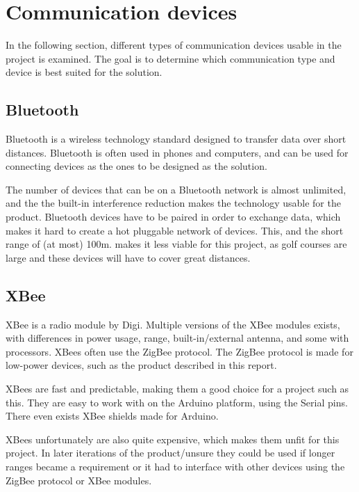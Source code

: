 \section{Communication devices}
In the following section, different types of communication devices usable in the project is examined. The goal is to determine which communication type and device is best suited for the solution.

\subsection{Bluetooth}
Bluetooth is a wireless technology standard designed to transfer data over short distances. Bluetooth is often used in phones and computers, and can be used for connecting devices as the ones to be designed as the solution. 

The number of devices that can be on a Bluetooth network is almost unlimited, and the the built-in interference reduction makes the technology usable for the product\cite{bluetoothbasics}.
Bluetooth devices have to be paired in order to exchange data, which makes it hard to create a hot pluggable network of devices. This, and the short range of (at most) 100m\cite{bluetoothbasics}. makes it less viable for this project, as golf courses are large and these devices will have to cover great distances.

\subsection{XBee}
XBee is a radio module by Digi. Multiple versions of the XBee modules exists, with differences in power usage, range, built-in/external antenna, and some with processors\cite{sparkfunXbeeGuide}.
XBees often use the ZigBee protocol. The ZigBee protocol is made for low-power devices, such as the product described in this report\cite{zigbee}.

XBees are fast and predictable, making them a good choice for a project such as this. They are easy to work with on the Arduino platform, using the Serial pins. There even exists XBee shields made for Arduino.

XBees unfortunately are also quite expensive, which makes them unfit for this project. In later iterations of the product/unsure  they could be used if longer ranges became a requirement or it had to interface with other devices using the ZigBee protocol or XBee modules.

